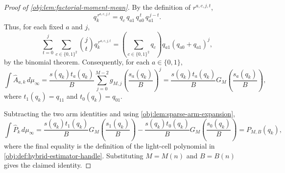 \begin{proof}[Proof of \cref{obj:lem:factorial-moment-mean}]
By the definition of \(r^{a,c,j,t}\),
\[
q_k^{\,r^{a,c,j,t}}
=
q_c\,q_{a1}\,q_{a0}^{\,t}\,q_{a1}^{\,j-t}.
\]
Thus, for each fixed \(a\) and \(j\),
\[
\sum_{t=0}^{j}\sum_{c\in\{0,1\}^2}
\binom jt q_k^{\,r^{a,c,j,t}}
=
\left(\sum_{c\in\{0,1\}^2}q_c\right)
q_{a1}
(q_{a0}+q_{a1})^j,
\]
by the binomial theorem.
Consequently, for each \(a\in\{0,1\}\),
\[
\int \widehat A_{a,k}\,d\mu_\infty
=
\frac{s(q_k)t_a(q_k)}{B}
\sum_{j=0}^{M-2}
g_{M,j}
\left(\frac{s_a(q_k)}{B}\right)^j
=
\frac{s(q_k)t_a(q_k)}{B}
G_M\!\left(\frac{s_a(q_k)}{B}\right),
\]
where \(t_1(q_k)=q_{11}\) and \(t_0(q_k)=q_{01}\).

Subtracting the two arm identities and using \cref{obj:lem:sparse-arm-expansion},
\[
\int \widehat P_k\,d\mu_\infty
=
\frac{s(q_k)t_1(q_k)}{B}
G_M\!\left(\frac{s_1(q_k)}{B}\right)
-
\frac{s(q_k)t_0(q_k)}{B}
G_M\!\left(\frac{s_0(q_k)}{B}\right)
=
P_{M,B}(q_k),
\]
where the final equality is the definition of the light-cell polynomial in \cref{obj:def:hybrid-estimator-handle}.  Substituting \(M=M(n)\) and \(B=B(n)\) gives the claimed identity.
\end{proof}
